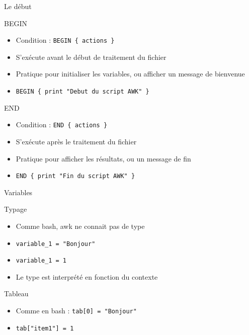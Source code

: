 \def\ftitle{Le début}
\begin{frame}[containsverbatim]{\ftitle}
\def\blocktitle{BEGIN}
\begin{block}{\blocktitle}
\begin{itemize}
\item Condition : \verb!BEGIN { actions }!
\item S'exécute avant le début de traitement du fichier
\item Pratique pour initialiser les variables, ou afficher un message de bienvenue
\item \verb!BEGIN { print "Debut du script AWK" }!
\end{itemize}
\end{block}
\def\blocktitle{END}
\begin{block}{\blocktitle}
\begin{itemize}
\item Condition : \verb!END { actions }!
\item S'exécute après le traitement du fichier
\item Pratique pour afficher les résultats, ou un message de fin
\item \verb!END { print "Fin du script AWK" }!
\end{itemize}
\end{block}
\end{frame}


\def\ftitle{Variables}
\begin{frame}[containsverbatim]{\ftitle}
\def\blocktitle{Typage}
\begin{block}{\blocktitle}
\begin{itemize}
\item Comme bash, awk ne connait pas de type
\item \verb!variable_1 = "Bonjour"!
\item \verb!variable_1 = 1!
\item Le type est interprété en fonction du contexte
\end{itemize}
\end{block}

\def\blocktitle{Tableau}
\begin{block}{\blocktitle}
\begin{itemize}
\item Comme en bash : \verb!tab[0] = "Bonjour"!
\item \verb!tab["item1"] = 1!
\end{itemize}
\end{block}
\end{frame}


